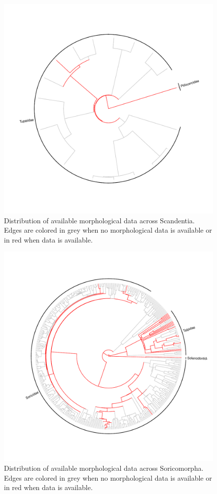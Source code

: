 \begin{figure}[!htbp]
\centering
    \includegraphics[width=1\textwidth]{Supplementary/Supp_figure_SCANDENTIA.pdf}
\caption{Distribution of available morphological data across Scandentia. Edges are colored in grey when no morphological data is available or in red when data is available.}
\label{Supp_Figure_Phylo-Scandentia}
\end{figure}

\begin{figure}[!htbp]
\centering
    \includegraphics[width=1\textwidth]{Supplementary/Supp_figure_SORICOMORPHA.pdf}
\caption{Distribution of available morphological data across Soricomorpha. Edges are colored in grey when no morphological data is available or in red when data is available.}
\label{Supp_Figure_Phylo-Soricomorpha}
\end{figure}